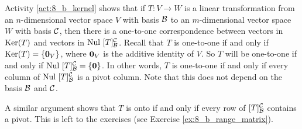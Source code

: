 Activity \ref{act:8_b_kernel} shows that if $T: V \to W$ is a linear transformation from an $n$-dimensional vector space $V$ with basis $\mathcal{B}$ to an $m$-dimensional vector space $W$ with basis $\mathcal{C}$, then there is a one-to-one correspondence between vectors in $\text{Ker}(T)$ and vectors in $\text{Nul } [T]_{\mathcal{B}}^{\mathcal{C}}$. Recall that $T$ is one-to-one if and only if $\text{Ker}(T) = \{\mathbf{0}_V\}$, where $\mathbf{0}_V$ is the additive identity of $V$. So $T$ will be one-to-one if and only if $\text{Nul } [T]_{\mathcal{B}}^{\mathcal{C}} = \{\mathbf{0}\}$. In other words, $T$ is one-to-one if and only if every column of $\text{Nul } [T]_{\mathcal{B}}^{\mathcal{C}}$ is a pivot column. Note that this does not depend on the basis $\mathcal{B}$ and $\mathcal{C}$. 

A similar argument shows that $T$ is onto if and only if every row of $[T]_{\mathcal{B}}^{\mathcal{C}}$ contains a pivot. This is left to the exercises (see Exercise \ref{ex:8_b_range_matrix}).


\ExampleIntro

